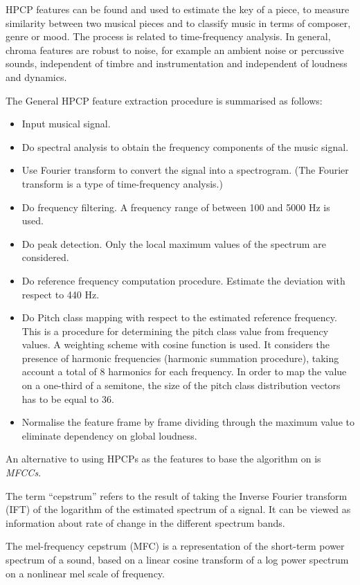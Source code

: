 HPCP features can be found and used to estimate the key of a piece, to measure similarity between two musical pieces and to classify music in terms of composer, genre or mood. The process is related to time-frequency analysis. In general, chroma features are robust to noise, for example an ambient noise or percussive sounds, independent of timbre and instrumentation and independent of loudness and dynamics.

The General HPCP feature extraction procedure is summarised as follows:
\begin{itemize}
\item Input musical signal.
\item Do spectral analysis to obtain the frequency components of the music signal.
\item Use Fourier transform to convert the signal into a spectrogram. (The Fourier transform is a type of time-frequency analysis.)
\item Do frequency filtering. A frequency range of between 100 and 5000 Hz is used.
\item Do peak detection. Only the local maximum values of the spectrum are considered.
\item Do reference frequency computation procedure. Estimate the deviation with respect to 440 Hz.
\item Do Pitch class mapping with respect to the estimated reference frequency. This is a procedure for determining the pitch class value from frequency values. A weighting scheme with cosine function is used. It considers the presence of harmonic frequencies (harmonic summation procedure), taking account a total of 8 harmonics for each frequency. In order to map the value on a one-third of a semitone, the size of the pitch class distribution vectors has to be equal to 36.
\item Normalise the feature frame by frame dividing through the maximum value to eliminate dependency on global loudness.
\end{itemize}

An alternative to using HPCPs as the features to base the algorithm on is \textit{MFCCs}.

The term ``cepstrum'' refers to the result of taking the Inverse Fourier transform (IFT) of the logarithm of the estimated spectrum of a signal. It can be viewed as information about rate of change in the different spectrum bands.

The mel-frequency cepstrum (MFC) is a representation of the short-term power spectrum of a sound, based on a linear cosine transform of a log power spectrum on a nonlinear mel scale of frequency. 

